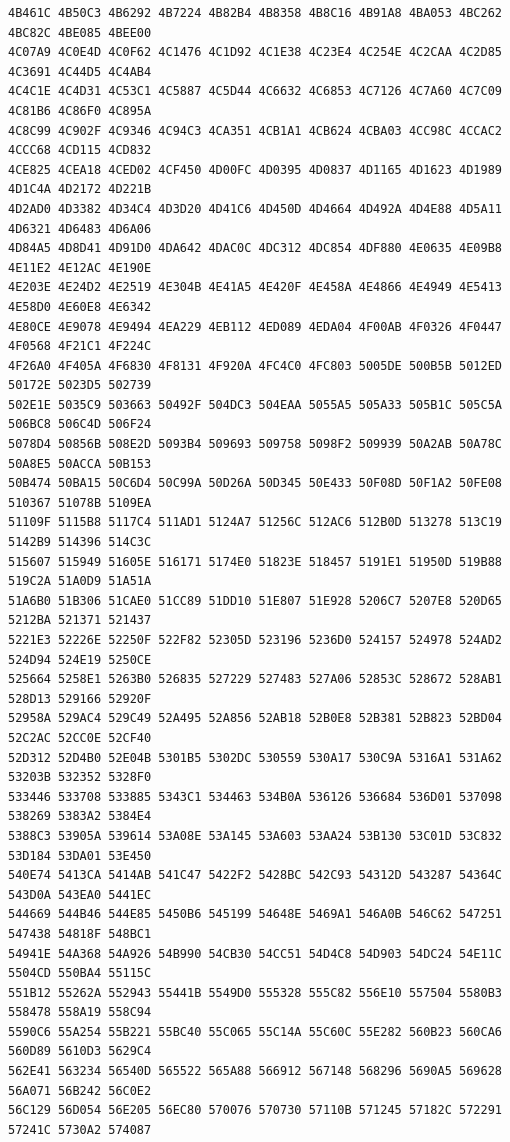 \documentclass[11pt]{amsart}
\theoremstyle{remark}
\begin{document}
{\begin{verbatim}
4B461C 4B50C3 4B6292 4B7224 4B82B4 4B8358 4B8C16 4B91A8 4BA053 4BC262 4BC82C 4BE085 4BEE00
4C07A9 4C0E4D 4C0F62 4C1476 4C1D92 4C1E38 4C23E4 4C254E 4C2CAA 4C2D85 4C3691 4C44D5 4C4AB4
4C4C1E 4C4D31 4C53C1 4C5887 4C5D44 4C6632 4C6853 4C7126 4C7A60 4C7C09 4C81B6 4C86F0 4C895A
4C8C99 4C902F 4C9346 4C94C3 4CA351 4CB1A1 4CB624 4CBA03 4CC98C 4CCAC2 4CCC68 4CD115 4CD832
4CE825 4CEA18 4CED02 4CF450 4D00FC 4D0395 4D0837 4D1165 4D1623 4D1989 4D1C4A 4D2172 4D221B
4D2AD0 4D3382 4D34C4 4D3D20 4D41C6 4D450D 4D4664 4D492A 4D4E88 4D5A11 4D6321 4D6483 4D6A06
4D84A5 4D8D41 4D91D0 4DA642 4DAC0C 4DC312 4DC854 4DF880 4E0635 4E09B8 4E11E2 4E12AC 4E190E
4E203E 4E24D2 4E2519 4E304B 4E41A5 4E420F 4E458A 4E4866 4E4949 4E5413 4E58D0 4E60E8 4E6342
4E80CE 4E9078 4E9494 4EA229 4EB112 4ED089 4EDA04 4F00AB 4F0326 4F0447 4F0568 4F21C1 4F224C
4F26A0 4F405A 4F6830 4F8131 4F920A 4FC4C0 4FC803 5005DE 500B5B 5012ED 50172E 5023D5 502739
502E1E 5035C9 503663 50492F 504DC3 504EAA 5055A5 505A33 505B1C 505C5A 506BC8 506C4D 506F24
5078D4 50856B 508E2D 5093B4 509693 509758 5098F2 509939 50A2AB 50A78C 50A8E5 50ACCA 50B153
50B474 50BA15 50C6D4 50C99A 50D26A 50D345 50E433 50F08D 50F1A2 50FE08 510367 51078B 5109EA
51109F 5115B8 5117C4 511AD1 5124A7 51256C 512AC6 512B0D 513278 513C19 5142B9 514396 514C3C
515607 515949 51605E 516171 5174E0 51823E 518457 5191E1 51950D 519B88 519C2A 51A0D9 51A51A
51A6B0 51B306 51CAE0 51CC89 51DD10 51E807 51E928 5206C7 5207E8 520D65 5212BA 521371 521437
5221E3 52226E 52250F 522F82 52305D 523196 5236D0 524157 524978 524AD2 524D94 524E19 5250CE
525664 5258E1 5263B0 526835 527229 527483 527A06 52853C 528672 528AB1 528D13 529166 52920F
52958A 529AC4 529C49 52A495 52A856 52AB18 52B0E8 52B381 52B823 52BD04 52C2AC 52CC0E 52CF40
52D312 52D4B0 52E04B 5301B5 5302DC 530559 530A17 530C9A 5316A1 531A62 53203B 532352 5328F0
533446 533708 533885 5343C1 534463 534B0A 536126 536684 536D01 537098 538269 5383A2 5384E4
5388C3 53905A 539614 53A08E 53A145 53A603 53AA24 53B130 53C01D 53C832 53D184 53DA01 53E450
540E74 5413CA 5414AB 541C47 5422F2 5428BC 542C93 54312D 543287 54364C 543D0A 543EA0 5441EC
544669 544B46 544E85 5450B6 545199 54648E 5469A1 546A0B 546C62 547251 547438 54818F 548BC1
54941E 54A368 54A926 54B990 54CB30 54CC51 54D4C8 54D903 54DC24 54E11C 5504CD 550BA4 55115C
551B12 55262A 552943 55441B 5549D0 555328 555C82 556E10 557504 5580B3 558478 558A19 558C94
5590C6 55A254 55B221 55BC40 55C065 55C14A 55C60C 55E282 560B23 560CA6 560D89 5610D3 5629C4
562E41 563234 56540D 565522 565A88 566912 567148 568296 5690A5 569628 56A071 56B242 56C0E2
56C129 56D054 56E205 56EC80 570076 570730 57110B 571245 57182C 572291 57241C 5730A2 574087

\end{verbatim}}
\end{document}
